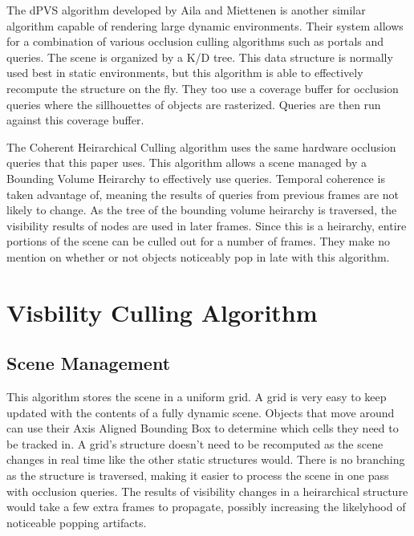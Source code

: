 \documentclass[12pt]{ucthesis}
\begin{document}
The dPVS algorithm developed by Aila and Miettenen is another similar algorithm capable of rendering large dynamic environments.\cite{dpvs}
Their system allows for a combination of various occlusion culling algorithms such as portals and queries.
The scene is organized by a K/D tree.
This data structure is normally used best in static environments, but this algorithm is able to effectively recompute the structure on the fly.
They too use a coverage buffer for occlusion queries where the sillhouettes of objects are rasterized.
Queries are then run against this coverage buffer.

The Coherent Heirarchical Culling algorithm uses the same hardware occlusion queries that this paper uses.\cite{CHC, CHCpp}
This algorithm allows a scene managed by a Bounding Volume Heirarchy to effectively use queries.
Temporal coherence is taken advantage of, meaning the results of queries from previous frames are not likely to change.
As the tree of the bounding volume heirarchy is traversed, the visibility results of nodes are used in later frames.
Since this is a heirarchy, entire portions of the scene can be culled out for a number of frames.
They make no mention on whether or not objects noticeably pop in late with this algorithm.

\chapter{Visbility Culling Algorithm}
\label{visibility-culling-algorithm}

\section{Scene Management}
\label{scene-management}

This algorithm stores the scene in a uniform grid.
A grid is very easy to keep updated with the contents of a fully dynamic scene.
Objects that move around can use their Axis Aligned Bounding Box to determine which cells they need to be tracked in.
A grid's structure doesn't need to be recomputed as the scene changes in real time like the other static structures would.
There is no branching as the structure is traversed, making it easier to process the scene in one pass with occlusion queries.
The results of visibility changes in a heirarchical structure would take a few extra frames to propagate, possibly increasing the likelyhood of noticeable popping artifacts.
\end{document}
